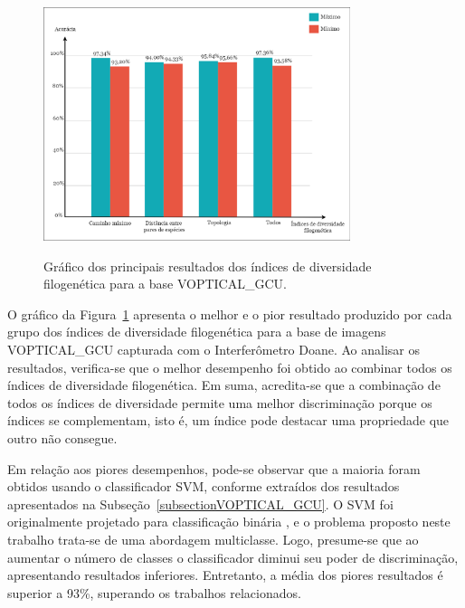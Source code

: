 
\begin{figure}[!ht]
    \centering
    \caption{Gráfico dos principais resultados dos índices de diversidade filogenética para a base VOPTICAL\_GCU.}
    \includegraphics[width=0.8\textwidth]{figs/graficoIndices1.png}
    \label{fig:graficoIndicesDF}
\end{figure}

O gráfico da Figura~\ref{fig:graficoIndicesDF} apresenta o melhor e o pior resultado produzido por cada grupo dos índices de diversidade filogenética para a base de imagens VOPTICAL\_GCU capturada com o Interferômetro Doane. Ao analisar os resultados, verifica-se que o melhor desempenho foi obtido ao combinar todos os índices de diversidade filogenética. Em suma, acredita-se que a combinação de todos os índices de diversidade permite uma melhor discriminação porque os índices se complementam, isto é, um índice pode destacar uma propriedade que outro não consegue.

Em relação aos piores desempenhos, pode-se observar que a maioria foram obtidos usando o classificador SVM, conforme extraídos dos resultados apresentados na Subseção~\ref{subsectionVOPTICAL_GCU}. O SVM foi originalmente projetado para classificação binária \cite{hsu2002comparison}, e o problema proposto neste trabalho trata-se de uma abordagem multiclasse. Logo, presume-se que ao aumentar o número de classes o classificador diminui seu poder de discriminação, apresentando resultados inferiores. Entretanto, a média dos piores resultados é superior a 93\%, superando os trabalhos relacionados.

